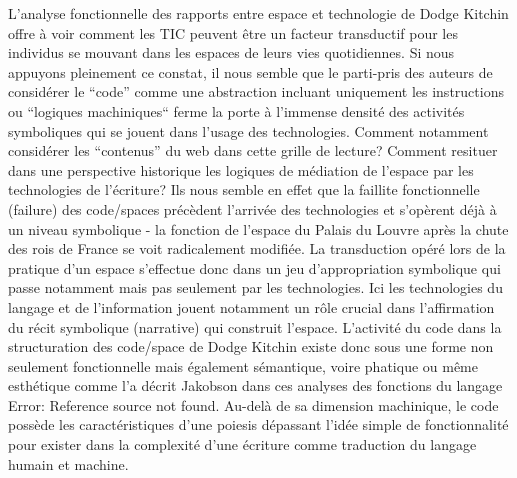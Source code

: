 L’analyse fonctionnelle des rapports entre espace et technologie de Dodge  Kitchin offre à voir comment les TIC peuvent être un facteur transductif pour les individus se mouvant dans les espaces de leurs vies quotidiennes. Si nous appuyons pleinement ce constat, il nous semble que le parti-pris des auteurs de considérer le “code” comme une abstraction incluant uniquement les instructions ou “logiques machiniques“ ferme la porte à l’immense densité des activités symboliques qui se jouent dans l’usage des technologies. Comment notamment considérer les “contenus” du web dans cette grille de lecture? Comment resituer dans une perspective historique les logiques de médiation de l’espace par les technologies de l’écriture? Ils nous semble en effet que la faillite fonctionnelle (failure) des code/spaces précèdent l’arrivée des technologies et s’opèrent déjà à un niveau symbolique - la fonction de l’espace du Palais du Louvre après la chute des rois de France se voit radicalement modifiée. La transduction opéré lors de la pratique d’un espace s’effectue donc dans un jeu d’appropriation symbolique qui passe notamment mais pas seulement par les technologies. Ici les technologies du langage et de l’information jouent notamment un rôle crucial dans l’affirmation du récit symbolique (narrative) qui construit l’espace. L’activité du code dans la structuration des code/space de Dodge  Kitchin existe donc sous une forme non seulement fonctionnelle mais également sémantique, voire phatique ou même esthétique comme l’a décrit Jakobson dans ces analyses des fonctions du langage Error: Reference source not found. Au-delà de sa dimension machinique, le code possède les caractéristiques d’une poiesis dépassant l’idée simple de fonctionnalité pour exister dans la complexité d’une écriture comme traduction du langage humain et machine.

